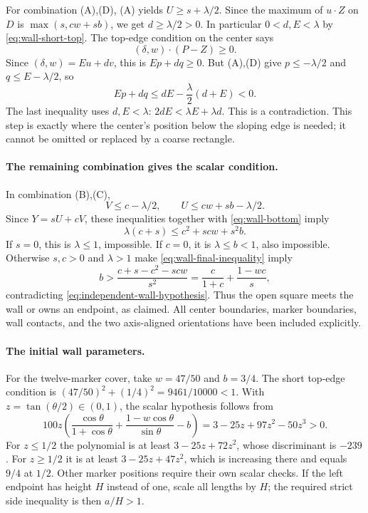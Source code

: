 \documentclass[11pt]{article}
\begin{document}
For combination (A),(D), (A) yields $U\ge s+\lambda/2$.
Since the maximum of $u\cdot Z$ on $D$ is $\max(s,cw+sb)$,
we get $d\ge\lambda/2>0$. In particular $0<d,E<\lambda$ by
\eqref{eq:wall-short-top}. The top-edge condition on the center says
\[
 (\delta,w)\cdot(P-Z)\ge0.
\]
Since $(\delta,w)=E u+d v$, this is $Ep+dq\ge0$.
But (A),(D) give $p\le-\lambda/2$ and $q\le E-\lambda/2$, so
\[
 Ep+dq\le dE-\frac\lambda2(d+E)<0.
\]
The last inequality uses $d,E<\lambda$:
$2dE<\lambda E+\lambda d$. This is a contradiction.
This step is exactly where the center's position below the sloping edge
is needed; it cannot be omitted or replaced by a coarse rectangle.

\paragraph{The remaining combination gives the scalar condition.}
In combination (B),(C),
\[
 V\le c-\lambda/2,\qquad U\le cw+sb-\lambda/2.
\]
Since $Y=sU+cV$, these inequalities together with
\eqref{eq:wall-bottom} imply
\begin{equation}\label{eq:wall-final-inequality}
 \lambda(c+s)\le c^2+scw+s^2b.
\end{equation}
If $s=0$, this is $\lambda\le1$, impossible. If $c=0$, it is
$\lambda\le b<1$, also impossible. Otherwise $s,c>0$ and
$\lambda>1$ make \eqref{eq:wall-final-inequality} imply
\[
 b>\frac{c+s-c^2-scw}{s^2}
   =\frac{c}{1+c}+\frac{1-wc}{s},
\]
contradicting \eqref{eq:independent-wall-hypothesis}.
Thus the open square meets the wall or owns an endpoint, as claimed.
All center boundaries, marker boundaries, wall contacts, and the two
axis-aligned orientations have been included explicitly.


\paragraph{The initial wall parameters.}
For the twelve-marker cover, take $w=47/50$ and $b=3/4$.
The short top-edge condition is
$(47/50)^2+(1/4)^2=9461/10000<1$.
With $z=\tan(\theta/2)\in(0,1)$, the scalar hypothesis follows from
\[
100z\left(\frac{\cos\theta}{1+\cos\theta}
 +\frac{1-w\cos\theta}{\sin\theta}-b\right)
=3-25z+97z^2-50z^3>0.
\]
For $z\le1/2$ the polynomial is at least $3-25z+72z^2$, whose
discriminant is $-239$. For $z\ge1/2$ it is at least
$3-25z+47z^2$, which is increasing there and equals $9/4$ at $1/2$.
Other marker positions require their own scalar checks.
If the left endpoint has height $H$ instead of one, scale all lengths by
$H$; the required strict side inequality is then $a/H>1$.
\end{document}
